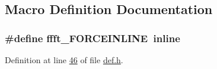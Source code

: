 \subsection{Macro Definition Documentation}
\hypertarget{a00089_a31b2ada863c9efa7455efae4e13661f3}{
\subsubsection[{ffft\+\_\+\+F\+O\+R\+C\+E\+I\+N\+L\+I\+N\+E}]{\setlength{\rightskip}{0pt plus 5cm}\#define ffft\+\_\+\+F\+O\+R\+C\+E\+I\+N\+L\+I\+N\+E~inline}}\label{a00089_a31b2ada863c9efa7455efae4e13661f3}


Definition at line \hyperlink{a00089_source_l00046}{46} of file \hyperlink{a00089_source}{def.\+h}.

